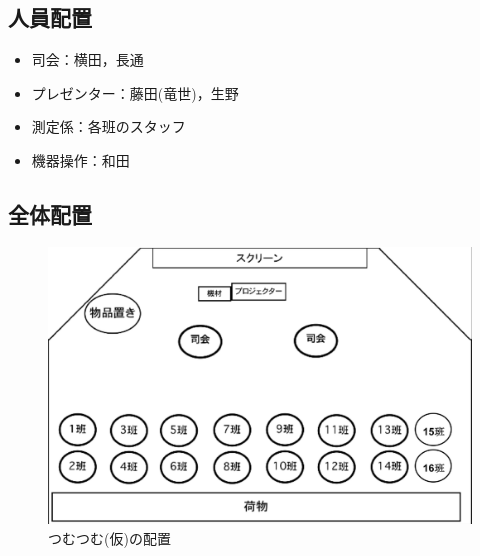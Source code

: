 \documentclass[a4j,titlepage]{jarticle}
\begin{document}
\subsection{人員配置}
\begin{itemize}
\item 司会：横田，長通
\item プレゼンター：藤田(竜世)，生野
\item 測定係：各班のスタッフ
\item 機器操作：和田
\end{itemize}


\subsection{全体配置}
\begin{figure}[h]
  \begin{center}
    \includegraphics[scale=0.5]{./22/ice.eps}
    \caption{つむつむ(仮)の配置}
    \label{fig:paper}
  \end{center}
\end{figure}

\end{document}
